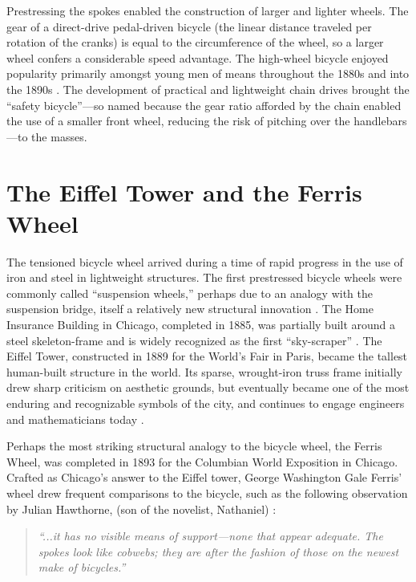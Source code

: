 \documentclass[../thesis.tex]{subfiles}
\begin{document}
Prestressing the spokes enabled the construction of larger and lighter wheels. The gear of a direct-drive pedal-driven bicycle (the linear distance traveled per rotation of the cranks) is equal to the circumference of the wheel, so a larger wheel confers a considerable speed advantage. The high-wheel bicycle enjoyed popularity primarily amongst young men of means throughout the 1880s and into the 1890s \cite{Smith1972}. The development of practical and lightweight chain drives brought the ``safety bicycle''---so named because the gear ratio afforded by the chain enabled the use of a smaller front wheel, reducing the risk of pitching over the handlebars---to the masses.

\section{The Eiffel Tower and the Ferris Wheel}

The tensioned bicycle wheel arrived during a time of rapid progress in the use of iron and steel in lightweight structures. The first prestressed bicycle wheels were commonly called ``suspension wheels,'' perhaps due to an analogy with the suspension bridge, itself a relatively new structural innovation \cite{Sewall1896}. The Home Insurance Building in Chicago, completed in 1885, was partially built around a steel skeleton-frame and is widely recognized as the first ``sky-scraper'' \cite{Miller1997}. The Eiffel Tower, constructed in 1889 for the World's Fair in Paris, became the tallest human-built structure in the world. Its sparse, wrought-iron truss frame initially drew sharp criticism on aesthetic grounds, but eventually became one of the most enduring and recognizable symbols of the city, and continues to engage engineers and mathematicians today \cite{Weidman2004}.

Perhaps the most striking structural analogy to the bicycle wheel, the Ferris Wheel, was completed in 1893 for the Columbian World Exposition in Chicago. Crafted as Chicago's answer to the Eiffel tower, George Washington Gale Ferris' wheel drew frequent comparisons to the bicycle, such as the following observation by Julian Hawthorne, (son of the novelist, Nathaniel) \cite{Larson2004}:

\begin{quote}
\emph{``...it has no visible means of support---none that appear adequate. The spokes look like cobwebs; they are after the fashion of those on the newest make of bicycles.''}
\end{quote}
\end{document}
